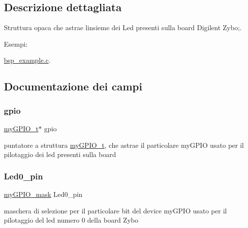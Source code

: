\subsection{Descrizione dettagliata}
Struttura opaca che astrae l\textquotesingle{}insieme dei Led presenti sulla board Digilent Zybo;. \begin{Desc}
\item[Esempi\+: ]\par
\hyperlink{bsp_example_8c-example}{bsp\+\_\+example.\+c}.\end{Desc}


\subsection{Documentazione dei campi}
\mbox{\label{struct_zybo_led__t_ac37ddc7c58d246d233dfb38037020184}} 
\subsubsection{\texorpdfstring{gpio}{gpio}}
{\footnotesize\ttfamily \hyperlink{structmy_g_p_i_o__t}{my\+G\+P\+I\+O\+\_\+t}$\ast$ gpio}

puntatore a struttura \hyperlink{structmy_g_p_i_o__t}{my\+G\+P\+I\+O\+\_\+t}, che astrae il particolare my\+G\+P\+IO usato per il pilotaggio dei led presenti sulla board \mbox{\label{struct_zybo_led__t_ac5afef2eef91d5533a23435cfcc60104}} 
\subsubsection{\texorpdfstring{Led0\+\_\+pin}{Led0\_pin}}
{\footnotesize\ttfamily \hyperlink{group__bare-metal_ga402a0d20afc0cb7c25554b8b023f4253}{my\+G\+P\+I\+O\+\_\+mask} Led0\+\_\+pin}

maschera di selezione per il particolare bit del device my\+G\+P\+IO usato per il pilotaggio del led numero 0 della board Zybo \mbox{\label{struct_zybo_led__t_adc78fb167f1dd6693910813d4ec5930e}} 
